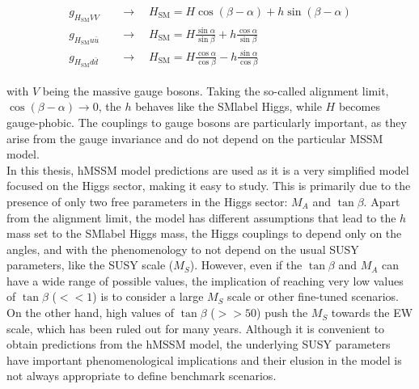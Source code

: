 \begin{align}
    \begin{split}
    g_{H_\text{SM}VV}\quad &\rightarrow\quad H_\text{SM} = H \cos(\beta-\alpha)+h\sin(\beta-\alpha)\\
    g_{H_\text{SM}u\bar{u}}\quad &\rightarrow\quad H_\text{SM} = H \frac{\sin\alpha}{\sin\beta}+h\frac{\cos\alpha}{\sin\beta}\\
    g_{H_\text{SM}d\bar{d}}\quad &\rightarrow\quad H_\text{SM} = H \frac{\cos\alpha}{\cos\beta}-h\frac{\sin\alpha}{\cos\beta}
\end{split}
\end{align}

with $V$ being the massive gauge bosons. Taking the so-called alignment limit, $\cos(\beta-\alpha)\to 0$, the $h$ behaves like the \acrshort{SMlabel} Higgs, while $H$ becomes gauge-phobic. The couplings to gauge bosons are particularly important, as they arise from the gauge invariance and do not depend on the particular MSSM model.\\

In this thesis, hMSSM model predictions are used as it is a very simplified model focused on the Higgs sector, making it easy to study. This is primarily due to the presence of only two free parameters in the Higgs sector: $M_A$ and $\tan\beta$. Apart from the alignment limit, the model has different assumptions that lead to the $h$ mass set to the \acrshort{SMlabel} Higgs mass, the Higgs couplings to depend only on the angles, and with the phenomenology to not depend on the usual SUSY parameters, like the SUSY scale ($M_S$). However, even if the $\tan\beta$ and $M_{A}$ can have a wide range of possible values, the implication of reaching very low values of $\tan\beta$ ($<<1$) is to consider a large $M_S$ scale or other fine-tuned scenarios. On the other hand, high values of $\tan\beta$ ($>>50$) push the $M_S$ towards the \acrshort{EW} scale, which has been ruled out for many years. Although it is convenient to obtain predictions from the hMSSM model, the underlying SUSY parameters have important phenomenological implications and their elusion in the model is not always appropriate to define benchmark scenarios. \\

